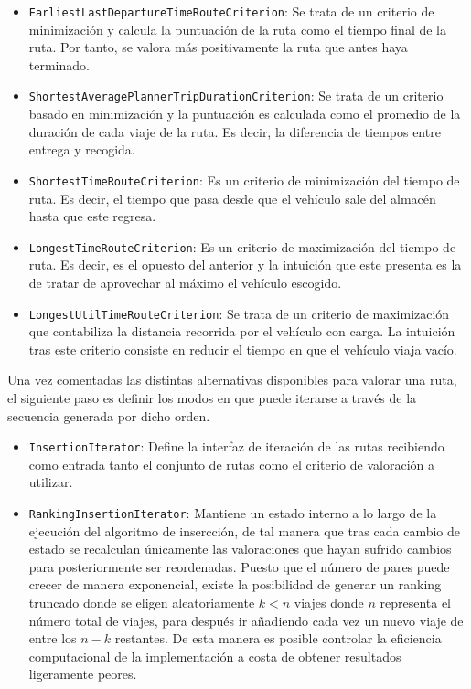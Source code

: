 \documentclass{subfiles}
\begin{document}
\begin{itemize}
\begin{itemize}
                      \item \texttt{EarliestLastDepartureTimeRouteCriterion}: Se trata de un criterio de minimización y calcula la puntuación de la ruta como el tiempo final de la ruta. Por tanto, se valora más positivamente la ruta que antes haya terminado.

                      \item \texttt{ShortestAveragePlannerTripDurationCriterion}: Se trata de un criterio basado en minimización y la puntuación es calculada como el promedio de la duración de cada viaje de la ruta. Es decir, la diferencia de tiempos entre entrega y recogida.

                      \item \texttt{ShortestTimeRouteCriterion}: Es un criterio de minimización del tiempo de ruta. Es decir, el tiempo que pasa desde que el vehículo sale del almacén hasta que este regresa.

                      \item \texttt{LongestTimeRouteCriterion}: Es un criterio de maximización del tiempo de ruta. Es decir, es el opuesto del anterior y la intuición que este presenta es la de tratar de aprovechar al máximo el vehículo escogido.

                      \item \texttt{LongestUtilTimeRouteCriterion}: Se trata de un criterio de maximización que contabiliza la distancia recorrida por el vehículo con carga. La intuición tras este criterio consiste en reducir el tiempo en que el vehículo viaja vacío.

                  \end{itemize}

                  Una vez comentadas las distintas alternativas disponibles para valorar una ruta, el siguiente paso es definir los modos en que puede iterarse a través de la secuencia generada por dicho orden.

                  \begin{itemize}

                      \item \texttt{InsertionIterator}: Define la interfaz de iteración de las rutas recibiendo como entrada tanto el conjunto de rutas como el criterio de valoración a utilizar.

                      \item \texttt{RankingInsertionIterator}: Mantiene un estado interno a lo largo de la ejecución del algoritmo de insercción, de tal manera que tras cada cambio de estado se recalculan únicamente las valoraciones que hayan sufrido cambios para posteriormente ser reordenadas. Puesto que el número de pares puede crecer de manera exponencial, existe la posibilidad de generar un ranking truncado donde se eligen aleatoriamente $k < n$ viajes donde $n$ representa el número total de viajes, para después ir añadiendo cada vez un nuevo viaje de entre los $n-k$ restantes. De esta manera es posible controlar la eficiencia computacional de la implementación a costa de obtener resultados ligeramente peores.


\end{itemize}
\end{itemize}
\end{document}
